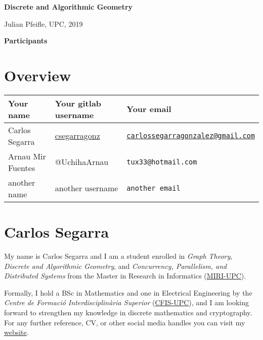 \documentclass[11pt]{amsart}
\begin{document}
\begin{center}
\textbf{\sffamily
   Discrete and Algorithmic Geometry }

\medskip
   Julian Pfeifle,
   UPC, 2019
\end{center}

\bigskip

\begin{center}
  \textbf{\sffamily Participants}
\end{center}

\medskip

\section*{Overview}

\begin{center}
  \begin{tabular}[c]{lll}
    Your name
    & Your gitlab username
    & Your email
    \\\hline
    Carlos Segarra
    & \href{https://gitlab.com/csegarragonz}{csegarragonz}
    & \texttt{\href{mailto:carlossegarragonzalez@gmail.com}{carlossegarragonzalez@gmail.com}}
    \\\hline
    Arnau Mir Fuentes
    & @UchihaArnau
    & \texttt{tux33@hotmail.com}
    \\\hline
    another name
    & another username
    & \texttt{another email}
  \end{tabular}
\end{center}

\section*{Carlos Segarra}

My name is Carlos Segarra and I am a student enrolled in \textit{Graph Theory}, \textit{Discrete and Algorithmic Geometry}, and \textit{Concurrency, Parallelism, and Distributed Systems} from the Master in Research in Informatics (\href{https://www.fib.upc.edu/en/studies/masters/master-innovation-and-research-informatics}{MIRI-UPC}).

Formally, I hold a BSc in Mathematics and one in Electrical Engineering by the \textit{Centre de Formaci\'o Interdisciplin\`aria Superior} (\href{https://cfis.upc.edu}{CFIS-UPC}), and I am looking forward to strengthen my knowledge in discrete mathematics and cryptography.
For any further reference, CV, or other social media handles you can visit my \href{https://carlossegarra.com}{website}.
\end{document}
